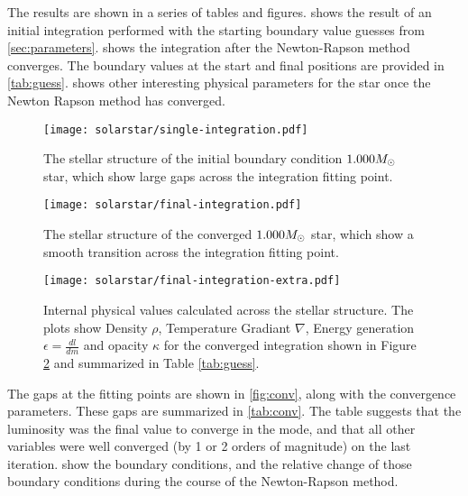\documentclass[10pt]{article}
\begin{document}
The results are shown in a series of tables and figures.  shows the result of an initial integration performed with the starting boundary value guesses from \cref{sec:parameters}.  shows the integration after the Newton-Rapson method converges. The boundary values at the start and final positions are provided in \cref{tab:guess}.  shows other interesting physical parameters for the star once the Newton Rapson method has converged.

 \begin{figure}[htbp]
    \centering
    \texttt{[image: solarstar/single-integration.pdf]}
    \caption[Initial Integration]{The stellar structure of the initial boundary condition $1.000 M_\odot$ star, which show large gaps across the integration fitting point.}
    \label{fig:firstint}
 \end{figure}
 
 \begin{figure}[htbp]
    \centering
    \texttt{[image: solarstar/final-integration.pdf]}
    \caption[Converged Integration]{The stellar structure of the converged $1.000 M_\odot$ star, which show a smooth transition across the integration fitting point.}
    \label{fig:finalint}
 \end{figure}
 

 \begin{figure}[htbp]
    \centering
    \texttt{[image: solarstar/final-integration-extra.pdf]}
    \caption[Properties of the Converged Integration]{Internal physical values calculated across the stellar structure. The plots show Density $\rho$, Temperature Gradiant $\nabla$, Energy generation $\epsilon = \frac{dl}{dm}$ and opacity $\kappa$ for the converged integration shown in Figure \ref{fig:finalint} and summarized in Table \ref{tab:guess}. }
    \label{fig:finalintextra}
 \end{figure}
 
\begin{table}[htbp]
\begin{center}
\label{tab:guess}

\end{center}
\end{table}

The gaps at the fitting points are shown in \cref{fig:conv}, along with the convergence parameters. These gaps are summarized in \cref{tab:conv}. The table suggests that the luminosity was the final value to converge in the mode, and that all other variables were well converged (by 1 or 2 orders of magnitude) on the last iteration.  show the boundary conditions, and the relative change of those boundary conditions during the course of the Newton-Rapson method.
\end{document}
